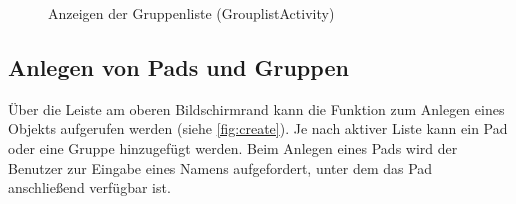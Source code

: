 \begin{figure}[h!]
    \centering
    \setlength\fboxsep{0pt}
	  \caption{Anzeigen der Gruppenliste (GrouplistActivity)}
	  \label{fig:Gruppenliste}
\end{figure}

\subsection{Anlegen von Pads und Gruppen}
Über die Leiste am oberen Bildschirmrand kann die Funktion zum Anlegen eines Objekts aufgerufen werden (siehe \autoref{fig:create}).
Je nach aktiver Liste kann ein Pad oder eine Gruppe hinzugefügt werden.
Beim Anlegen eines Pads wird der Benutzer zur Eingabe eines Namens aufgefordert, unter dem das Pad anschließend verfügbar ist.

